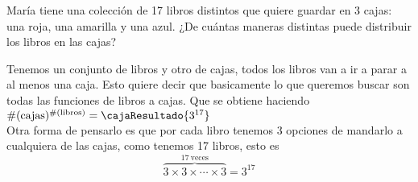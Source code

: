 \begin{enunciado}{\ejercicio}
  María tiene una colección de 17 libros distintos que quiere guardar en 3 cajas:
  una roja, una amarilla y una azul.
  ¿De cuántas maneras distintas puede distribuir los libros en las cajas?
\end{enunciado}

Tenemos un conjunto de libros y otro de cajas, todos los libros van a ir a parar a al menos una caja.
Esto quiere decir que basicamente lo que queremos buscar son todas las funciones de libros a cajas. 
Que se obtiene haciendo $\#(\text{cajas})^{\#(\text{libros})} = \cajaResultado{3^{17}}$ \\
Otra forma de pensarlo es que por cada libro tenemos $3$ opciones de mandarlo a cualquiera de las cajas,
como tenemos 17 libros, esto es
\[\overbrace{3 \times 3 \times \cdots \times 3}^{17\ \text{veces}} = 3^{17}\]

\begin{aportes}
  \item {}
\end{aportes}
